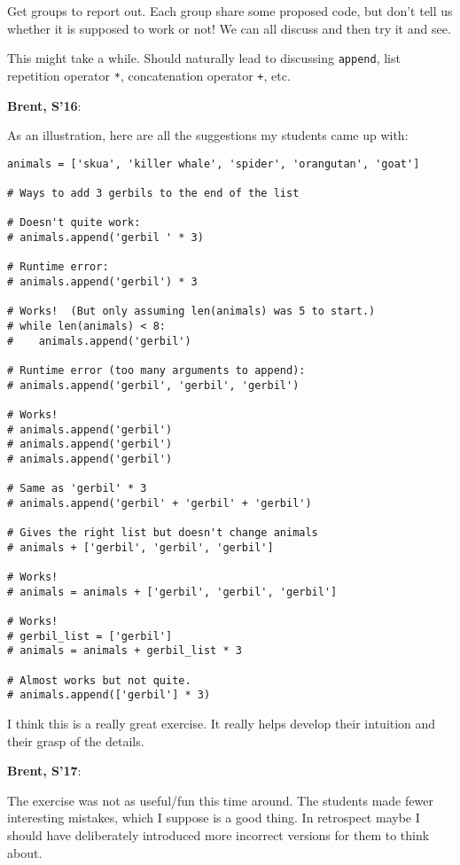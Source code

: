 \documentclass{article}
\newenvironment{reflect}[1]
{
  \noindent
  \begin{lrbox}{\reflectbox}
    \begin{minipage}[t]{\textwidth}
      \textbf{#1}:
}{
    \end{minipage}
  \end{lrbox}
  \fbox{\usebox{\reflectbox}}
}
\begin{document}
Get groups to report out.  Each group share some proposed code, but
don't tell us whether it is supposed to work or not!  We can all
discuss and then try it and see.

This might take a while.  Should naturally lead to discussing
\verb|append|, list repetition operator \verb|*|, concatenation
operator \verb|+|, etc.

\begin{reflect}{Brent, S'16}
  As an illustration, here are all the suggestions my students came up
  with:
\begin{verbatim}
animals = ['skua', 'killer whale', 'spider', 'orangutan', 'goat']

# Ways to add 3 gerbils to the end of the list

# Doesn't quite work:
# animals.append('gerbil ' * 3)

# Runtime error:
# animals.append('gerbil') * 3

# Works!  (But only assuming len(animals) was 5 to start.)
# while len(animals) < 8:
#    animals.append('gerbil')

# Runtime error (too many arguments to append):
# animals.append('gerbil', 'gerbil', 'gerbil')

# Works!
# animals.append('gerbil')
# animals.append('gerbil')
# animals.append('gerbil')

# Same as 'gerbil' * 3
# animals.append('gerbil' + 'gerbil' + 'gerbil')

# Gives the right list but doesn't change animals
# animals + ['gerbil', 'gerbil', 'gerbil']

# Works!
# animals = animals + ['gerbil', 'gerbil', 'gerbil']

# Works!
# gerbil_list = ['gerbil']
# animals = animals + gerbil_list * 3

# Almost works but not quite.
# animals.append(['gerbil'] * 3)
\end{verbatim}

  I think this is a really great exercise. It really helps develop
  their intuition and their grasp of the details.
\end{reflect}

\begin{reflect}{Brent, S'17}
  The exercise was not as useful/fun this time around.  The students
  made fewer interesting mistakes, which I suppose is a good thing.
  In retrospect maybe I should have deliberately introduced more
  incorrect versions for them to think about.
\end{reflect}
\end{document}

